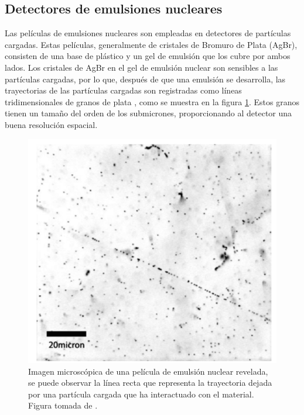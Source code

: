 \documentclass[12pt,oneside,openany,letter]{book}
\begin{document}
\subsection{Detectores de emulsiones nucleares}
Las pel\'iculas de emulsiones nucleares son empleadas en detectores de part\'iculas cargadas. Estas pel\'iculas, generalmente de cristales de Bromuro de Plata (AgBr), consisten de una base de pl\'astico y un gel de emulsi\'on que los cubre por ambos lados. Los cristales de AgBr en el gel de emulsi\'on nuclear son sensibles a las part\'iculas cargadas, por lo que, despu\'es de que una emulsi\'on se desarrolla, las trayectorias de las part\'iculas cargadas son registradas como l\'ineas tridimensionales de granos de plata \cite{nishiyama2014experimental}, como se muestra en la figura \ref{emulsion}. Estos granos tienen un tama\~no del orden de los submicrones, proporcionando al detector una buena resoluci\'on espacial.
\begin{figure}
\begin{center}
\includegraphics[scale=0.6]{images/emulsion.png}
\caption[Imagen microsc\'opica de una pel\'icula de emulsi\'on nuclear revelada]{Imagen microsc\'opica de una pel\'icula de emulsi\'on nuclear revelada, se puede observar la l\'inea recta que representa la trayectoria dejada por una part\'icula cargada que ha interactuado con el material. Figura tomada de \cite{nishiyama2014experimental}.}
\label{emulsion}
\end{center}
\end{figure}
\end{document}
